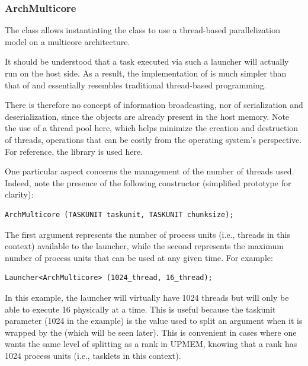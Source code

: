 \subsubsection{ArchMulticore}

The  class allows instantiating the  class to use a thread-based parallelization model on a multicore architecture.

It should be understood that a task executed via such a launcher will actually run on the host side. As a result, the implementation of  is much simpler than that of 
and essentially resembles traditional thread-based programming.

There is therefore no concept of information broadcasting, nor of serialization and deserialization, since the objects are already present in the host memory. 
Note the use of a thread pool here, which helps minimize the creation and destruction of threads, operations that can be costly from the operating system's perspective. For reference, the  library is used here.

One particular aspect concerns the management of the number of threads used. Indeed, note the presence of the following constructor (simplified prototype for clarity):

\begin{verbatim}
ArchMulticore (TASKUNIT taskunit, TASKUNIT chunksize);
\end{verbatim}

The first argument represents the number of process units (i.e., threads in this context) available to the launcher, while the second represents the maximum number of process units that can be used at any given time. For example:

\begin{verbatim}
Launcher<ArchMulticore> (1024_thread, 16_thread);
\end{verbatim}

In this example, the launcher will virtually have 1024 threads but will only be able to execute 16 physically at a time. This is useful because the taskunit parameter (1024 in the example) is the value used to split an argument when it is wrapped by the  (which will be seen later). This is convenient in cases where one wants the same level of splitting as a rank in UPMEM, knowing that a rank has 1024 process units (i.e., tasklets in this context).

